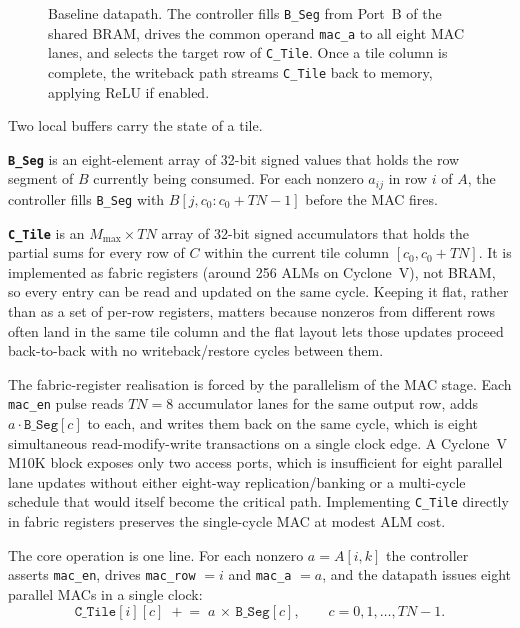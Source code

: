\begin{figure}[htbp]
  \caption{Baseline datapath. The controller fills \texttt{B\_Seg} from
           Port~B of the shared BRAM, drives the common operand
           \texttt{mac\_a} to all eight MAC lanes, and selects the target
           row of \texttt{C\_Tile}. Once a tile column is complete, the
           writeback path streams \texttt{C\_Tile} back to memory, applying
           ReLU if enabled.}
  \label{fig:datapath}
\end{figure}

Two local buffers carry the state of a tile.

\textbf{\texttt{B\_Seg}} is an eight-element array of 32-bit signed values
that holds the row segment of $B$ currently being consumed. For each nonzero
$a_{ij}$ in row $i$ of $A$, the controller fills \texttt{B\_Seg} with
$B[j, c_0:c_0{+}TN{-}1]$ before the MAC fires.

\textbf{\texttt{C\_Tile}} is an $M_{\mathrm{max}} \times TN$ array of 32-bit
signed accumulators that holds the partial sums for every row of $C$ within
the current tile column $[c_0, c_0{+}TN]$. It is implemented as fabric
registers (around 256 ALMs on Cyclone~V), not BRAM, so every entry can be
read and updated on the same cycle. Keeping it flat, rather than as a set
of per-row registers, matters because nonzeros from different rows often
land in the same tile column and the flat layout lets those updates proceed
back-to-back with no writeback/restore cycles between them.

The fabric-register realisation is forced by the parallelism of the
MAC stage. Each \texttt{mac\_en} pulse reads $TN = 8$ accumulator
lanes for the same output row, adds $a \cdot \texttt{B\_Seg}[c]$ to
each, and writes them back on the same cycle, which is eight
simultaneous read-modify-write transactions on a single clock edge.
A Cyclone~V M10K block exposes only two access ports, which is
insufficient for eight parallel lane updates without either eight-way
replication/banking or a multi-cycle schedule that would itself
become the critical path. Implementing \texttt{C\_Tile} directly in
fabric registers preserves the single-cycle MAC at modest ALM cost.

The core operation is one line. For each nonzero $a = A[i, k]$ the
controller asserts \texttt{mac\_en}, drives \texttt{mac\_row} $= i$ and
\texttt{mac\_a} $= a$, and the datapath issues eight parallel MACs in a
single clock:
\[
  \texttt{C\_Tile}[i][c] \;\mathrel{+}=\; a \,\times\, \texttt{B\_Seg}[c],
  \qquad c = 0, 1, \ldots, TN{-}1.
\]

